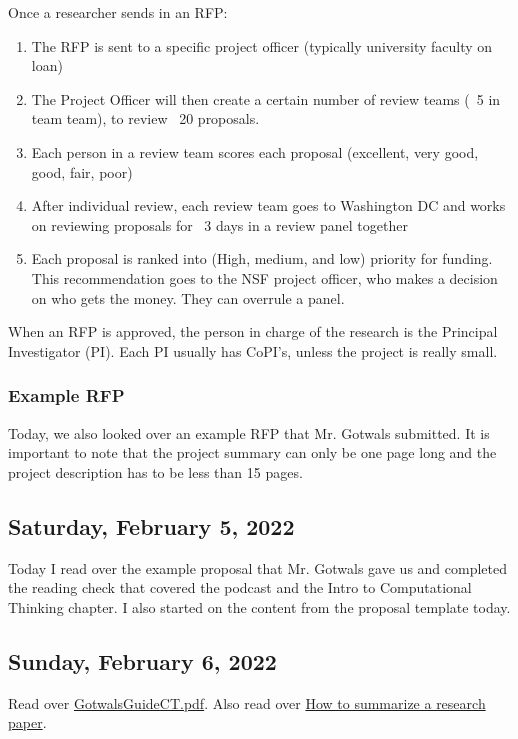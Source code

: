 \documentclass[11pt,letterpaper]{article}
\begin{document}
Once a researcher sends in an RFP:
\begin{enumerate}
    \item The RFP is sent to a specific project officer (typically university faculty on loan)
    \item The Project Officer will then create a certain number of review teams (~5 in team team), to review ~20 proposals.
    \item Each person in a review team scores each proposal (excellent, very good, good, fair, poor)
    \item After individual review, each review team goes to Washington DC and works on reviewing proposals for ~3 days in a review panel together
    \item Each proposal is ranked into (High, medium, and low) priority for funding. This recommendation goes to the NSF project officer, who makes a decision on who gets the money. They can overrule a panel.
\end{enumerate}

When an RFP is approved, the person in charge of the research is the Principal Investigator (PI). Each PI usually has CoPI's, unless the project is really small. 

\subsubsection * {Example RFP}
Today, we also looked over an example RFP that Mr. Gotwals submitted. It is important to note that the project summary can only be one page long and the project description has to be less than 15 pages. 

\subsection{Saturday, February 5, 2022}
Today I read over the example proposal that Mr. Gotwals gave us and completed the reading check that covered the podcast and the Intro to Computational Thinking chapter. I also started on the content from the proposal template today.

\subsection{Sunday, February 6, 2022}
Read over \href{https://drive.google.com/file/d/1weJUCV1x84bmy6dvqFjRlOviiD8dVDjg/view?usp=sharing}{GotwalsGuideCT.pdf}. Also read over \href{https://drive.google.com/file/d/1p4ew41jI2WH81WCaB8ADkFOrTVsac7Wl/view?usp=sharing}{How to summarize a research paper}.
\end{document}
